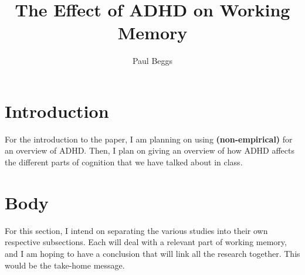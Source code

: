 \documentclass[stu]{apa7}
\title{The Effect of ADHD on Working Memory}
\author{Paul Beggs}
\begin{document}
\maketitle

\section{Introduction}

For the introduction to the paper, I am planning on using \textcite{faraone_attention-deficithyperactivity_2015} \textbf{(non-empirical)} for an overview of ADHD. Then, I plan on giving an overview of how ADHD affects the different parts of cognition that we have talked about in class. 

\section{Body}

For this section, I intend on separating the various studies into their own respective subsections. Each will deal with a relevant part of working memory, and I am hoping to have a conclusion that will link all the research together. This would be the take-home message.
\end{document}
